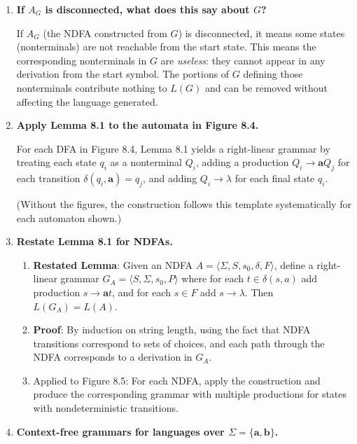 \begin{enumerate}[{8.}1. ]
\item \textbf{If $A_G$ is disconnected, what does this say about $G$?}

If $A_G$ (the NDFA constructed from $G$) is disconnected, it means some states (nonterminals) are not reachable from the start state. This means the corresponding nonterminals in $G$ are \emph{useless}: they cannot appear in any derivation from the start symbol. The portions of $G$ defining those nonterminals contribute nothing to $L(G)$ and can be removed without affecting the language generated.

\item \textbf{Apply Lemma 8.1 to the automata in Figure 8.4.}

For each DFA in Figure 8.4, Lemma 8.1 yields a right-linear grammar by treating each state $q_i$ as a nonterminal $Q_i$, adding a production $Q_i \to \pmb{a} Q_j$ for each transition $\delta(q_i, \pmb{a}) = q_j$, and adding $Q_i \to \lambda$ for each final state $q_i$.

(Without the figures, the construction follows this template systematically for each automaton shown.)

\item \textbf{Restate Lemma 8.1 for NDFAs.}

\begin{enumerate}
\item \textbf{Restated Lemma}: Given an NDFA $A = \langle\Sigma,S,s_0,\delta,F\rangle$, define a right-linear grammar $G_A = \langle S, \Sigma, s_0, P\rangle$ where for each $t \in \delta(s,a)$ add production $s \to \pmb{a}t$, and for each $s \in F$ add $s \to \lambda$. Then $L(G_A) = L(A)$.

\item \textbf{Proof}: By induction on string length, using the fact that NDFA transitions correspond to sets of choices, and each path through the NDFA corresponds to a derivation in $G_A$.

\item Applied to Figure 8.5: For each NDFA, apply the construction and produce the corresponding grammar with multiple productions for states with nondeterministic transitions.
\end{enumerate}

\item \textbf{Context-free grammars for languages over $\Sigma=\{\pmb{a},\pmb{b}\}$.}


\end{enumerate}
